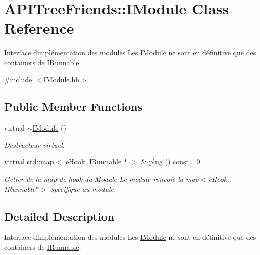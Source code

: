 \hypertarget{class_a_p_i_tree_friends_1_1_i_module}{}\section{A\+P\+I\+Tree\+Friends\+:\+:I\+Module Class Reference}
\label{class_a_p_i_tree_friends_1_1_i_module}


Interface d\textquotesingle{}implémentation des modules Les \hyperlink{class_a_p_i_tree_friends_1_1_i_module}{I\+Module} ne sont en définitive que des containers de \hyperlink{class_a_p_i_tree_friends_1_1_i_runnable}{I\+Runnable}.  




{\ttfamily \#include $<$I\+Module.\+hh$>$}

\subsection*{Public Member Functions}
\begin{DoxyCompactItemize}
\item 
\hypertarget{class_a_p_i_tree_friends_1_1_i_module_aa22ef80601340718cee4f78eec47b9ba}{}virtual \hyperlink{class_a_p_i_tree_friends_1_1_i_module_aa22ef80601340718cee4f78eec47b9ba}{$\sim$\+I\+Module} ()\label{class_a_p_i_tree_friends_1_1_i_module_aa22ef80601340718cee4f78eec47b9ba}

\begin{DoxyCompactList}\small\item\em Destructeur virtuel. \end{DoxyCompactList}\item 
virtual std\+::map$<$ \hyperlink{namespace_a_p_i_tree_friends_a3943902c0fe96b820b0261e510dcb720}{e\+Hook}, \hyperlink{class_a_p_i_tree_friends_1_1_i_runnable}{I\+Runnable} $\ast$ $>$ \& \hyperlink{class_a_p_i_tree_friends_1_1_i_module_a723bc72596e9f34b8a494ae4a32172e9}{plug} () const =0
\begin{DoxyCompactList}\small\item\em Getter de la map de hook du Module Le module renvoie la map$<$e\+Hook, I\+Runnable$\ast$$>$ spécifique au module. \end{DoxyCompactList}\end{DoxyCompactItemize}


\subsection{Detailed Description}
Interface d\textquotesingle{}implémentation des modules Les \hyperlink{class_a_p_i_tree_friends_1_1_i_module}{I\+Module} ne sont en définitive que des containers de \hyperlink{class_a_p_i_tree_friends_1_1_i_runnable}{I\+Runnable}. 

